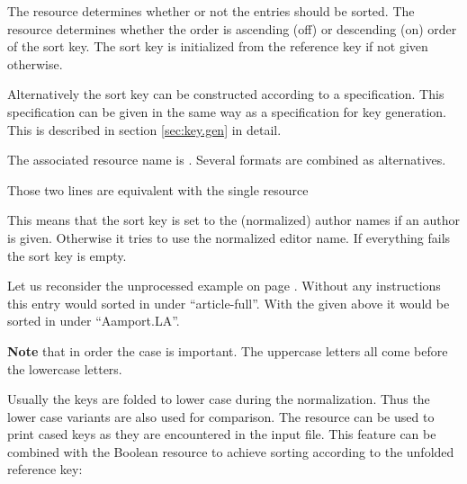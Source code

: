 \documentclass[11pt,a4paper]{scrbook}
\begin{document}
\begin{Resources}
\end{Resources}

The resource  determines whether or not the entries should be
sorted. The resource  determines whether the order is
ascending (off) or descending (on) \ASCII{} order of the sort key. The sort
key is initialized from the reference key if not given otherwise.

Alternatively the sort key can be constructed according to a specification.
This specification can be given in the same way as a specification for key
generation. This is described in section \ref{sec:key.gen} in detail.

The associated resource name is . Several formats are
combined as alternatives. 

\begin{Resources}
\end{Resources}

Those two lines are equivalent with the single resource

\begin{Resources}
\end{Resources}

This means that the sort key is set to the (normalized) author names if an
author is given. Otherwise it tries to use the normalized editor name. If
everything fails the sort key is empty.

Let us reconsider the unprocessed example on page \pageref{sample1}. Without
any  instructions this entry would sorted in under
``article-full''. With the  given above it would be sorted in
under ``Aamport.LA''.

\textbf{Note} that in \ASCII{} order the case is important. The
uppercase letters all come before the lowercase letters.  \medskip

Usually the keys are folded to lower case during the normalization. Thus the
lower case variants are also used for comparison. The resource
 can be used to print cased keys as they are
encountered in the input file. This feature can be combined with the Boolean
resource  to achieve sorting according to the unfolded
reference key:
\end{document}

